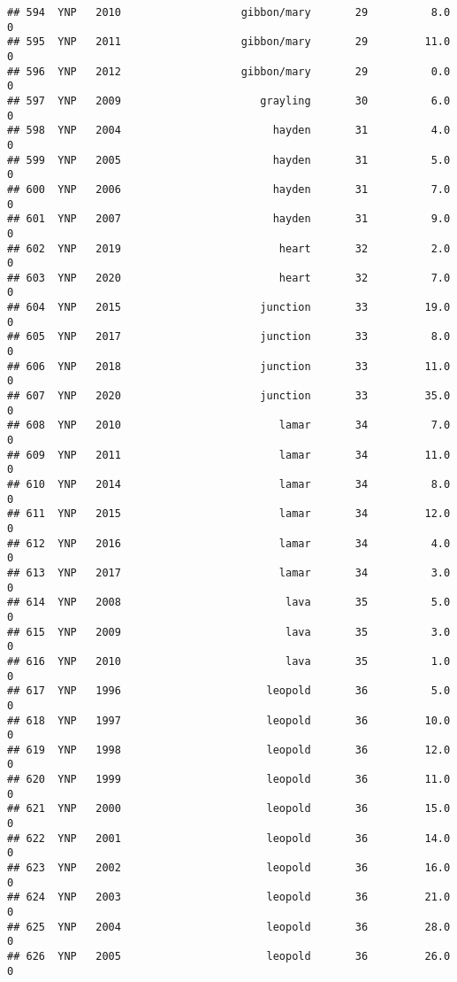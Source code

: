 \documentclass[
]{article}
\begin{document}
\begin{verbatim}
## 594  YNP   2010                   gibbon/mary       29          8.0       0
## 595  YNP   2011                   gibbon/mary       29         11.0       0
## 596  YNP   2012                   gibbon/mary       29          0.0       0
## 597  YNP   2009                      grayling       30          6.0       0
## 598  YNP   2004                        hayden       31          4.0       0
## 599  YNP   2005                        hayden       31          5.0       0
## 600  YNP   2006                        hayden       31          7.0       0
## 601  YNP   2007                        hayden       31          9.0       0
## 602  YNP   2019                         heart       32          2.0       0
## 603  YNP   2020                         heart       32          7.0       0
## 604  YNP   2015                      junction       33         19.0       0
## 605  YNP   2017                      junction       33          8.0       0
## 606  YNP   2018                      junction       33         11.0       0
## 607  YNP   2020                      junction       33         35.0       0
## 608  YNP   2010                         lamar       34          7.0       0
## 609  YNP   2011                         lamar       34         11.0       0
## 610  YNP   2014                         lamar       34          8.0       0
## 611  YNP   2015                         lamar       34         12.0       0
## 612  YNP   2016                         lamar       34          4.0       0
## 613  YNP   2017                         lamar       34          3.0       0
## 614  YNP   2008                          lava       35          5.0       0
## 615  YNP   2009                          lava       35          3.0       0
## 616  YNP   2010                          lava       35          1.0       0
## 617  YNP   1996                       leopold       36          5.0       0
## 618  YNP   1997                       leopold       36         10.0       0
## 619  YNP   1998                       leopold       36         12.0       0
## 620  YNP   1999                       leopold       36         11.0       0
## 621  YNP   2000                       leopold       36         15.0       0
## 622  YNP   2001                       leopold       36         14.0       0
## 623  YNP   2002                       leopold       36         16.0       0
## 624  YNP   2003                       leopold       36         21.0       0
## 625  YNP   2004                       leopold       36         28.0       0
## 626  YNP   2005                       leopold       36         26.0       0

\end{verbatim}
\end{document}
